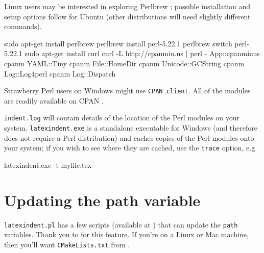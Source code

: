 		Linux users may be interested in exploring Perlbrew \cite{perlbrew}; possible installation and setup options follow for Ubuntu (other distributions will need slightly different commands).
		\begin{commandshell}
sudo apt-get install perlbrew
perlbrew install perl-5.22.1
perlbrew switch perl-5.22.1
sudo apt-get install curl
curl -L http://cpanmin.us | perl - App::cpanminus
cpanm YAML::Tiny
cpanm File::HomeDir
cpanm Unicode::GCString
cpanm Log::Log4perl
cpanm Log::Dispatch
\end{commandshell}

		Strawberry Perl users on Windows might use \texttt{CPAN client}.
		All of the modules are readily available on CPAN \cite{cpan}.

		\texttt{indent.log} will contain details of the location of the Perl modules on your system.
		\texttt{latexindent.exe} is a standalone executable for Windows (and therefore does not require a Perl distribution) and caches copies of the Perl modules onto your system; if you wish to see where they are cached, use the  \texttt{trace} option, e.g \begin{dosprompt}
latexindent.exe -t myfile.tex
 \end{dosprompt} 

	\section{Updating the path variable}
	 \label{sec:updating-path} \texttt{latexindent.pl} has a few scripts (available at \cite{latexindent-home}) that can update the \texttt{path} variables.
	 Thank you to \cite{jasjuang} for this feature.
	 If you're on a Linux or Mac machine, then you'll want \texttt{CMakeLists.txt} from \cite{latexindent-home}.
